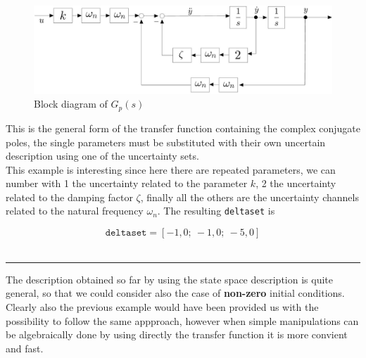 \documentclass[a4paper, 12pt]{article}
\begin{document}
\begin{figure}[h]
    \centering
    \includegraphics[scale=0.3]{img/complex.jpg}
    \caption{Block diagram of $G_p(s)$}
\end{figure}
\newpage
\noindent
This is the general form of the transfer function containing the complex conjugate poles, the single parameters must be substituted with their own uncertain description using one of the uncertainty sets.\\
 This example is interesting since here there are repeated parameters, we can number with 1 the uncertainty related to the parameter $k$, 2 the uncertainty related to the damping factor $\zeta$, finally all the others are the uncertainty channels related to the natural frequency $\omega_n$. The resulting \texttt{deltaset} is
 
 \begin{equation}
    \texttt{deltaset}=[
        -1,0; \
        -1,0; \
        -5,0
    ]
 \end{equation}\\
\vspace{-1cm}
\hrule
\vspace{0.3em}
\noindent
\textsf{The description obtained so far by using the state space description is quite general, so that we could consider also the case of \textbf{non-zero} initial conditions. Clearly also the previous example would have been provided us with the possibility to follow the same appproach, however when simple manipulations can be algebraically done by using directly the transfer function it is more convient and fast.}
\end{document}
